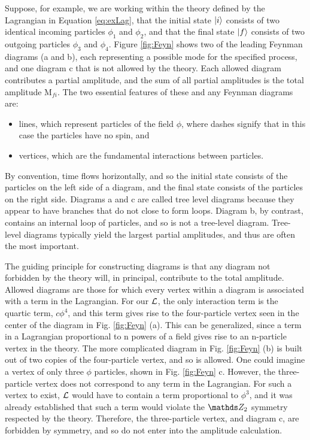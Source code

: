 Suppose, for example, we are working within the theory defined by the Lagrangian in Equation \ref{eq:exLag}, that the initial state $\ket{i}$ consists of two identical incoming particles $\phi_1$ and $\phi_2$, and that the final state $\ket{f}$ consists of two outgoing particles $\phi_3$ and $\phi_4$. Figure \ref{fig:Feyn} 
shows two of the leading Feynman diagrams (a and b), each representing a possible mode for the specified process, and one diagram c that is not allowed by the theory. Each allowed diagram contributes a partial amplitude, and the sum of all partial amplitudes is the total amplitude M$_{fi}$. The two essential features of these and any Feynman diagrams are:
\begin{itemize}
\item lines, which represent particles of the field $\phi$, where dashes signify that in this case the particles have no spin, and
\item vertices, which are the fundamental interactions between particles.  
\end{itemize}
By convention, time flows horizontally, and so the initial state consists of the particles on the left side of a diagram, and the final state consists of the particles on the right side. Diagrams a and c are called tree level diagrams because they appear to have branches that do not close to form loops. Diagram b, by contrast, contains an internal loop of particles, and so is not a tree-level diagram. Tree-level diagrams typically yield the largest partial amplitudes, and thus are often the most important.

The guiding principle for constructing diagrams is that any diagram not forbidden by the theory will, in principal, contribute to the total amplitude. Allowed diagrams are those for which every vertex within a diagram is associated with a term in the Lagrangian. For our $\mathcal{L}$, the only interaction term is the quartic term, $c\phi^4$, and this term gives rise to the four-particle vertex seen in the center of the diagram in Fig. \ref{fig:Feyn} (a). This can be generalized, since a term in a Lagrangian proportional to n powers of a field gives rise to an n-particle vertex in the theory. The more complicated diagram in Fig. \ref{fig:Feyn} (b) is built out of two copies of the four-particle vertex, and so is allowed. One could imagine a vertex of only three $\phi$ particles, shown in Fig. \ref{fig:Feyn} c. However, the three-particle vertex does not correspond to any term in the Lagrangian. For such a vertex to exist, $\mathcal{L}$ would have to contain a term proportional to $\phi^3$, and it was already established that such a term would violate the $\ztwo$ symmetry respected by the theory. Therefore, the three-particle vertex, and diagram c, are forbidden by symmetry, and so do not enter into the amplitude calculation. 

